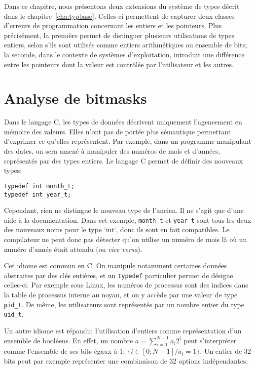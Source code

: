 Dans ce chapitre, nous présentons deux extensions du système de types décrit
dans le chapitre~\ref{cha:typbase}. Celles-ci permettent de capturer deux
classes d'erreurs de programmation concernant les entiers et les pointeurs. Plus
précisément, la première permet de distinguer plusieurs utilisations de types
entiers, selon s'ils sont utilisés comme entiers arithmétiques ou ensemble de
bits; la seconde, dans le contexte de systèmes d'exploitation, introduit une
différence entre les pointeurs dont la valeur est contrôlée par l'utilisateur et
les autres.

\section{Analyse de bitmasks}

\def\tBits{\textsc{Bits}\xspace}
\def\tChar{\textsc{Char}\xspace}

Dans le langage C, les types de données décrivent uniquement l'agencement en
mémoire des valeurs. Elles n'ont pas de portée plus sémantique permettant
d'exprimer ce qu'elles représentent. Par exemple, dans un programme manipulant
des dates, on sera amené à manipuler des numéros de mois et d'années,
représentés par des types entiers. Le langage C permet de définir des nouveaux
types:

\begin{verbatim}
typedef int month_t;
typedef int year_t;
\end{verbatim}

Cependant, rien ne distingue le nouveau type de l'ancien. Il ne s'agit que d'une
aide à la documentation. Dans cet exemple, \texttt{month\_t} et \texttt{year\_t}
sont tous les deux des nouveaux noms pour le type `int`, donc ils sont en fait
compatibles. Le compilateur ne peut donc pas détecter qu'on utilise un numéro de
mois là où un numéro d'année était attendu (ou \emph{vice versa}).

Cet idiome est commun en C. On manipule notamment certaines données abstraites
par des clés entières, et un \texttt{typedef} particulier permet de désigne
celles-ci. Par exemple sous Linux, les numéros de processus sont des indices
dans la table de processus interne au noyau, et on y accède par une valeur de
type \texttt{pid\_t}. De même, les utilisateurs sont représentés par un nombre
entier du type \texttt{uid\_t}.

Un autre idiome est répandu: l'utilisation d'entiers comme représentation d'un
ensemble de booléens. En effet, un nombre $a = \sum_{i=0}^{N-1} a_i 2^i$ peut
s'interpréter comme l'ensemble de ses bits égaux à 1: $\{ i ∈ [0;N-1] / a_i = 1
\}$. Un entier de 32 bits peut par exemple représenter une combinaison de 32
options indépendantes.

